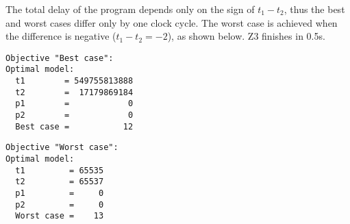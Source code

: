 \noindent
The total delay of the program depends only on the sign of $t_1 - t_2$, thus
the best and worst cases differ only by one clock cycle. The worst case is
achieved when the difference is negative ($t_1 - t_2 = -2$), as shown below.
Z3 finishes in 0.5s.

\vspace{2mm}
\noindent
\begin{minipage}{0.53\linewidth}
\begin{verbatim}
Objective "Best case":
Optimal model:
  t1        = 549755813888
  t2        =  17179869184
  p1        =            0
  p2        =            0
  Best case =           12
\end{verbatim}
\end{minipage}
\begin{minipage}{0.46\linewidth}
\begin{verbatim}
Objective "Worst case":
Optimal model:
  t1         = 65535
  t2         = 65537
  p1         =     0
  p2         =     0
  Worst case =    13
\end{verbatim}
\end{minipage}